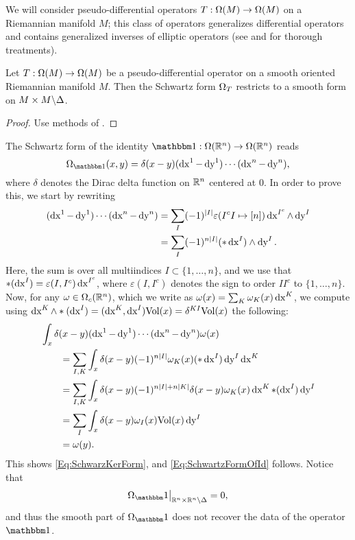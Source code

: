\documentclass[\MainFolder/Text.tex]{subfiles}
\begin{document}
We will consider pseudo-differential operators $T:\Omega(M)\rightarrow\Omega(M)$ on a Riemannian manifold $M$; this class of operators generalizes differential operators and contains generalized inverses of elliptic operators (see \cite{Albin2012} and \cite{Hormander} for thorough treatments).

\begin{Proposition} \label{Prop:ASD}
Let $T: \Omega(M) \rightarrow \Omega(M)$ be a pseudo-differential operator on a smooth oriented Riemannian manifold $M$. Then the Schwartz form $\Omega_{T}$ restricts to a smooth form on $M\times M\backslash\Delta$.
\end{Proposition}
\begin{proof}
Use methods of \cite{Hormander}.
\end{proof}
 
\begin{Example}\label{Ex:IdFE}The Schwartz form of the identity $\Id: \DR(\R^n)\rightarrow \DR(\R^n)$ reads
\begin{equation}\label{Eq:SchwartzFormOfId}
\DR_{\Id}(x,y) = \delta(x-y)(\Diff{x}^1 - \Diff{y}^1)\dotsb(\Diff{x}^n-\Diff{y}^n),
\end{equation}
where $\delta$ denotes the Dirac delta function on $\mathbb{R}^n$ centered at $0$. In order to prove this, we start by rewriting
\begin{align*}
(\operatorname{dx}^1 - \operatorname{dy}^1) \dotsb (\operatorname{dx}^n - \operatorname{dy}^n) &=\sum_{I}(-1)^{|I|} \varepsilon(I^c I \mapsto[n])\operatorname{dx}^{I^c} \wedge \operatorname{dy}^I \\
&=\sum_{I} (-1)^{n |I|} (* \operatorname{dx}^I) \wedge \operatorname{dy}^I.
\end{align*}
Here, the sum is over all multiindices $I\subset \{1,\dotsc,n\}$, and we use that $*(\operatorname{dx}^I) = \varepsilon(I, I^c) \operatorname{dx}^{I^c}$, where $\varepsilon(I,I^c)$ denotes the sign to order $I I^c$ to $\{1,\dotsc,n\}$. Now, for any $\omega\in \Omega_c(\mathbb{R}^n)$, which we write as $\omega(x) = \sum_K \omega_K(x)\operatorname{dx}^K$, we compute using $\operatorname{dx}^K\wedge*(\operatorname{dx}^I)=(\operatorname{dx}^K,\operatorname{dx}^I)\mathrm{Vol}(x) = \delta^{KI}\mathrm{Vol}(x)$ the following:
\begin{align*}
&\int_x \delta(x-y)  (\operatorname{dx}^1-\operatorname{dy}^1)\dotsb(\operatorname{dx}^n-\operatorname{dy}^n) \omega(x)  \\
&\qquad=\sum_{I,K} \int_x \delta(x-y)(-1)^{n|I|}  \omega_K(x)(* \operatorname{dx}^I)\operatorname{dy}^I\operatorname{dx}^K \\
&\qquad=\sum_{I,K}\int_x \delta(x-y) (-1)^{n|I| + n|K|} \delta(x-y)  \omega_K(x) \operatorname{dx}^K *(\operatorname{dx}^I) \operatorname{dy}^I \\
&\qquad=\sum_{I} \int_x \delta(x-y) \omega_I(x)\mathrm{Vol}(x) \operatorname{dy}^I \\
&\qquad=\omega(y).
\end{align*}
This shows \eqref{Eq:SchwarzKerForm}, and \eqref{Eq:SchwartzFormOfId} follows. Notice that
$$ \Restr{\DR_\Id}{\R^n\times \R^n\backslash \Diag} = 0, $$
and thus the smooth part of $\DR_\Id$ does not recover the data of the operator $\Id$.
\end{Example}
\end{document}
